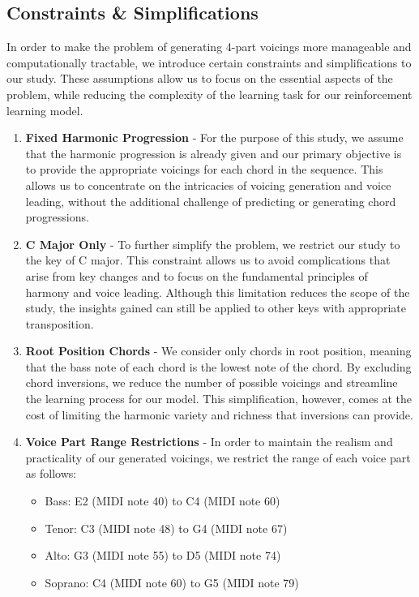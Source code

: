 \documentclass[12pt, letterpaper]{article}
\begin{document}
\subsection{Constraints \& Simplifications}

In order to make the problem of generating 4-part voicings more manageable and computationally tractable, we introduce certain constraints and simplifications to our study. These assumptions allow us to focus on the essential aspects of the problem, while reducing the complexity of the learning task for our reinforcement learning model.

\begin{enumerate}
    \item \textbf{Fixed Harmonic Progression} - For the purpose of this study, we assume that the harmonic progression is already given and our primary objective is to provide the appropriate voicings for each chord in the sequence. This allows us to concentrate on the intricacies of voicing generation and voice leading, without the additional challenge of predicting or generating chord progressions.
    \item \textbf{C Major Only} - To further simplify the problem, we restrict our study to the key of C major. This constraint allows us to avoid complications that arise from key changes and to focus on the fundamental principles of harmony and voice leading. Although this limitation reduces the scope of the study, the insights gained can still be applied to other keys with appropriate transposition.
    \item \textbf{Root Position Chords} - We consider only chords in root position, meaning that the bass note of each chord is the lowest note of the chord. By excluding chord inversions, we reduce the number of possible voicings and streamline the learning process for our model. This simplification, however, comes at the cost of limiting the harmonic variety and richness that inversions can provide.
    \item \textbf{Voice Part Range Restrictions} - In order to maintain the realism and practicality of our generated voicings, we restrict the range of each voice part as follows:
    \begin{itemize}
        \item Bass: E2 (MIDI note 40) to C4 (MIDI note 60)
        \item Tenor: C3 (MIDI note 48) to G4 (MIDI note 67)
        \item Alto: G3 (MIDI note 55) to D5 (MIDI note 74)
        \item Soprano: C4 (MIDI note 60) to G5 (MIDI note 79)
    \end{itemize}
\end{enumerate}
\end{document}
